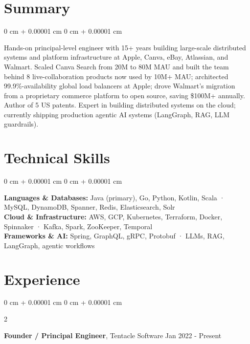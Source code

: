 \documentclass[10pt, letterpaper]{article}
\newenvironment{onecolentry}{
    \begin{adjustwidth}{
        0 cm + 0.00001 cm
    }{
        0 cm + 0.00001 cm
    }
}{
    \end{adjustwidth}
} %
\newenvironment{twocolentry}[2][]{
    \onecolentry
    \def\secondColumn{#2}
    \setcolumnwidth{\fill, 4.5 cm}
    \begin{paracol}{2}
}{
    \switchcolumn \raggedleft \secondColumn
    \end{paracol}
    \endonecolentry
} %
\begin{document}
    \section{Summary}
    \begin{onecolentry}
        Hands-on principal-level engineer with 15+ years building large-scale distributed systems and platform infrastructure at Apple, Canva, eBay, Atlassian, and Walmart. Scaled Canva Search from 20M to 80M MAU and built the team behind 8 live-collaboration products now used by 10M+ MAU; architected 99.9\%-availability global load balancers at Apple; drove Walmart's migration from a proprietary commerce platform to open source, saving \$100M+ annually. Author of 5 US patents. Expert in building distributed systems on the cloud; currently shipping production agentic AI systems (LangGraph, RAG, LLM guardrails).

    \end{onecolentry}

    \section{Technical Skills}
        \begin{onecolentry}
            \textbf{Languages \& Databases:} Java (primary), Go, Python, Kotlin, Scala · MySQL, DynamoDB, Spanner, Redis, Elasticsearch, Solr \\
            \textbf{Cloud \& Infrastructure:} AWS, GCP, Kubernetes, Terraform, Docker, Spinnaker · Kafka, Spark, ZooKeeper, Temporal \\
            \textbf{Frameworks \& AI:} Spring, GraphQL, gRPC, Protobuf · LLMs, RAG, LangGraph, agentic workflows \\
        \end{onecolentry}

    \section{Experience}
        \vspace{0.15 cm}
        \begin{twocolentry}{
            Jan 2022 - Present
        }
        \textbf{Founder / Principal Engineer}, Tentacle Software\end{twocolentry}
\end{document}
